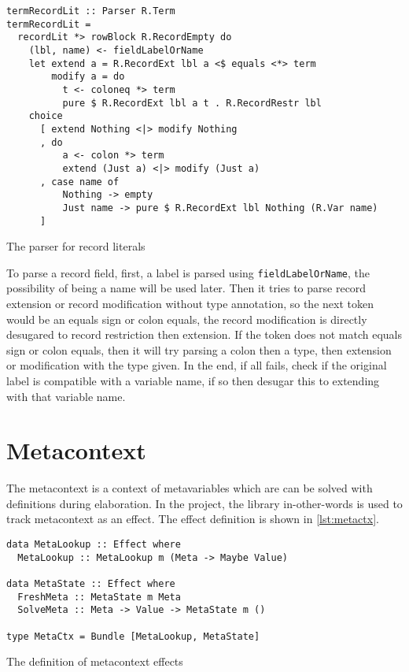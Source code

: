 \begin{listing}
  \begin{verbatim}
termRecordLit :: Parser R.Term
termRecordLit =
  recordLit *> rowBlock R.RecordEmpty do
    (lbl, name) <- fieldLabelOrName
    let extend a = R.RecordExt lbl a <$ equals <*> term
        modify a = do
          t <- coloneq *> term
          pure $ R.RecordExt lbl a t . R.RecordRestr lbl
    choice
      [ extend Nothing <|> modify Nothing
      , do
          a <- colon *> term
          extend (Just a) <|> modify (Just a)
      , case name of
          Nothing -> empty
          Just name -> pure $ R.RecordExt lbl Nothing (R.Var name)
      ]
  \end{verbatim}
  \caption{The parser for record literals}\label{lst:parse-recordlit}
\end{listing}

To parse a record field, first, a label is parsed using
\texttt{fieldLabelOrName}, the possibility of being a name will be used
later. Then it tries to parse record extension or record modification without
type annotation, so the next token would be an equals sign or colon equals, the
record modification is directly desugared to record restriction then extension.
If the token does not match equals sign or colon equals, then it will try
parsing a colon then a type, then extension or modification with the type given.
In the end, if all fails, check if the original label is compatible with a
variable name, if so then desugar this to extending with that variable name.

\section{Metacontext}\label{sec:meta}

The metacontext is a context of metavariables which are can be solved with
definitions during elaboration. In the project, the library in-other-words is
used to track metacontext as an effect. The effect definition is shown in
\cref{lst:metactx}.

\begin{listing}
  \begin{verbatim}
data MetaLookup :: Effect where
  MetaLookup :: MetaLookup m (Meta -> Maybe Value)

data MetaState :: Effect where
  FreshMeta :: MetaState m Meta
  SolveMeta :: Meta -> Value -> MetaState m ()

type MetaCtx = Bundle [MetaLookup, MetaState]
  \end{verbatim}
  \caption{The definition of metacontext effects}\label{lst:metactx}
\end{listing}

